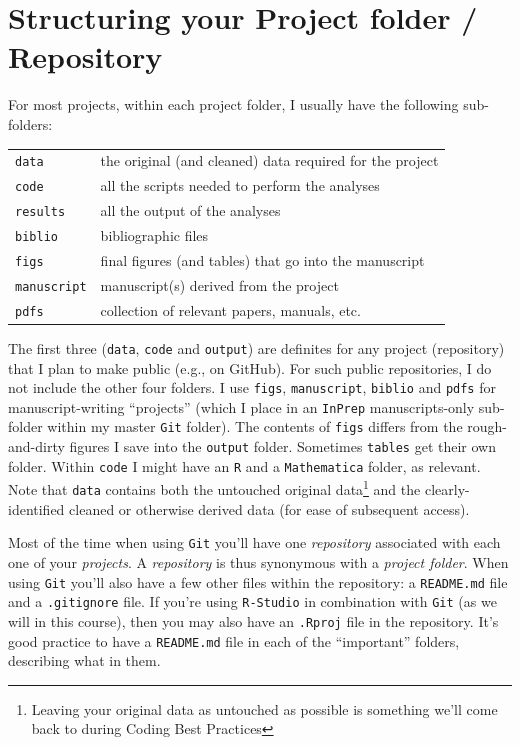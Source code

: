 \documentclass[12pt,letterpaper]{article}
\begin{document}
\section{Structuring your Project folder / Repository} \label{projectfolder}

For most projects, within each project folder, I usually have the following sub-folders:

\begin{tabular}{ll}
 \texttt{data} & the original (and cleaned) data required for the project\\
 \texttt{code} & all the scripts needed to perform the analyses \\
 \texttt{results} & all the output of the analyses \\
 \texttt{biblio} & bibliographic files\\
 \texttt{figs} & final figures (and tables) that go into the manuscript\\
 \texttt{manuscript} & manuscript(s) derived from the project\\
 \texttt{pdfs} & collection of relevant papers, manuals, etc.\\
\end{tabular}

\noindent
The first three (\texttt{data}, \texttt{code} and \texttt{output}) are definites for any project (repository) that I plan to make public (e.g., on GitHub).
For such public repositories, I do not include the other four folders.
I use \texttt{figs}, \texttt{manuscript}, \texttt{biblio} and \texttt{pdfs} for manuscript-writing ``projects'' (which I place in an \texttt{InPrep} manuscripts-only sub-folder within my master \texttt{Git} folder).
The contents of \texttt{figs} differs from the rough-and-dirty figures I save into the \texttt{output} folder.
Sometimes \texttt{tables} get their own folder.
Within \texttt{code} I might have an \texttt{R} and a \texttt{Mathematica} folder, as relevant.
Note that \texttt{data} contains both the untouched original data\footnote{Leaving your original data as untouched as possible is something we'll come back to during Coding Best Practices} and the clearly-identified cleaned or otherwise derived data (for ease of subsequent access).

Most of the time when using \texttt{Git} you'll have one \emph{repository} associated with each one of your \emph{projects}.  A \emph{repository} is thus synonymous with a \emph{project folder}.  When using \texttt{Git} you'll also have a few other files within the repository: a \texttt{README.md} file and a \texttt{.gitignore} file.  If you're using \texttt{R-Studio} in combination with \texttt{Git} (as we will in this course), then you may also have an \texttt{.Rproj} file in the repository.  It's good practice to have a \texttt{README.md} file in each of the ``important'' folders, describing what in them.
\end{document}
